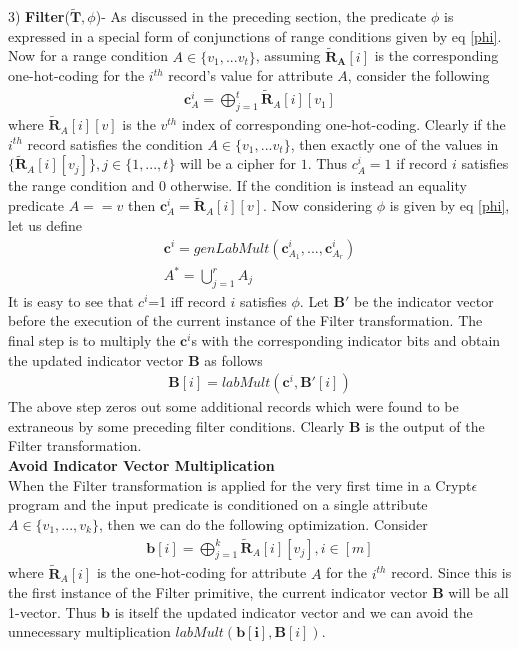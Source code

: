 3)\textbf{ \textsf{Filter}}($\mathbf{\tilde{T}},\phi$)-  As discussed in the preceding section, the predicate $\phi$ is expressed in a special form of conjunctions of range conditions given by eq \ref{phi}. Now for a range condition $A \in \{v_1,...v_t\}$, assuming $\mathbf{\tilde{R}_A}[i]$ is the corresponding one-hot-coding for the $i^{th}$ record's value for attribute $A$,  consider the following \begin{gather}\mathbf{c}_A^i=\bigoplus_{j=1}^{t}\tilde{\mathbf{R}}_{A}[i][v_1]\end{gather} where $\tilde{\mathbf{R}}_{A}[i][v]$ is the $v^{th}$ index of corresponding one-hot-coding. Clearly if the $i^{th}$ record satisfies the condition $A \in \{v_1,...v_t\}$, then exactly one of the values in $\{\tilde{\mathbf{R}}_{A}[i][v_j]\}, j \in \{1,...,t\}$ will be a cipher for $1$. Thus $c_A^i=1$ if record $i$ satisfies the range condition and 0 otherwise. If the condition is instead an equality predicate $A==v$ then $\mathbf{c}_A^i=\tilde{\mathbf{R}}_{A}[i][v]$. Now considering $\phi$ is given by eq \ref{phi}, let us define\begin{gather}\mathbf{c}^i=genLabMult(\mathbf{c}^i_{A_1},...,\mathbf{c}^i_{A_r})\\A^*=\bigcup_{j=1}^rA_j\end{gather} It is easy to see that $c^i$=1 iff record $i$ satisfies $\phi$. Let $\mathbf{B}'$ be the indicator vector before the execution of the current instance of the \textsf{Filter} transformation. The final step is to multiply the $\mathbf{c}^i$s with the corresponding indicator bits and obtain the updated indicator vector $\mathbf{B}$ as follows \begin{gather}\mathbf{B}[i]=labMult(\mathbf{c}^i,\mathbf{B}'[i])\end{gather} 
The above step zeros out some additional records which were found to be extraneous by some preceding filter conditions. Clearly $\textbf{B}$ is the output of the \textsf{Filter} transformation.
\\\textbf{Avoid Indicator Vector Multiplication}\\
When the \textsf{Filter} transformation is applied for the very first time in a Crypt$\epsilon$ program and the input predicate is conditioned on a single attribute $A \in \{v_1,...,v_k\}$, then we can do the following optimization. Consider \begin{gather}\mathbf{b}[i]=\bigoplus_{j=1}^k \mathbf{\tilde{R}}_A[i][v_j], i \in [m]\end{gather} where $\mathbf{\tilde{R}}_A[i]$ is the one-hot-coding for attribute $A$ for the $i^{th}$ record. Since this is the first instance of the \textsf{Filter} primitive, the current indicator vector $\mathbf{B}$  will be all 1-vector. Thus $\mathbf{b}$ is itself the updated indicator vector  and we can avoid the unnecessary multiplication $labMult(\mathbf{b[i]},\mathbf{B}[i])$.  

